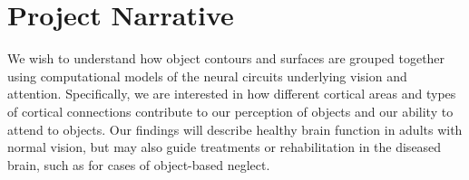 \documentclass[11pt,notitlepage]{article}
\begin{document}
\clearpage

\section*{Project Narrative}

We wish to understand how object contours and surfaces are grouped together using computational models of the neural circuits underlying vision and attention. Specifically, we are interested in how different cortical areas and types of cortical connections contribute to our perception of objects and our ability to attend to objects. Our findings will describe healthy brain function in adults with normal vision, but may also guide treatments or rehabilitation in the diseased brain, such as for cases of object-based neglect.

\clearpage

\end{document}
